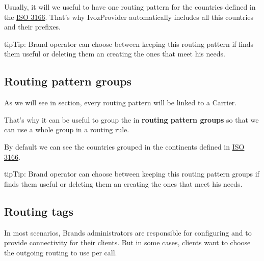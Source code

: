 \documentclass[letterpaper,10pt,english]{sphinxmanual}
\begin{document}
Usually, it will we useful to have one routing pattern for the countries
defined in the \href{https://en.wikipedia.org/wiki/ISO\_3166}{ISO 3166}. That's why IvozProvider automatically
includes all this countries and their prefixes.

\begin{notice}{tip}{Tip:}
Brand operator can choose between keeping this routing pattern if
finds them useful or deleting them an creating the ones that meet his needs.
\end{notice}


\subsection{Routing pattern groups}
\label{administration_portal/brand/routing/routing_patterns_groups::doc}\label{administration_portal/brand/routing/routing_patterns_groups:routing-pattern-groups}\label{administration_portal/brand/routing/routing_patterns_groups:id1}
As we will see in {\hyperref[administration_portal/brand/routing/outgoing_routings:outgoing\string-routings]{}} section, every routing
pattern will be linked to a Carrier.

That's why it can be useful to group the {\hyperref[administration_portal/brand/routing/routing_patterns:id1]{}} in \textbf{routing pattern groups}
so that we can use a whole group in a routing rule.

By default we can see the countries grouped in the continents defined in
\href{https://en.wikipedia.org/wiki/ISO\_3166}{ISO 3166}.

\begin{notice}{tip}{Tip:}
Brand operator can choose between keeping this routing pattern groups if
finds them useful or deleting them an creating the ones that meet his needs.
\end{notice}


\subsection{Routing tags}
\label{administration_portal/brand/routing/routing_tags:routing-tags}\label{administration_portal/brand/routing/routing_tags::doc}
In most scenarios, Brands administrators are responsible for configuring
{\hyperref[administration_portal/brand/providers/carriers:carriers]{}} and {\hyperref[administration_portal/brand/routing/outgoing_routings:outgoing\string-routings]{}} to provide connectivity for
their clients. But in some cases, clients want to choose the outgoing routing to
use per call.
\end{document}
